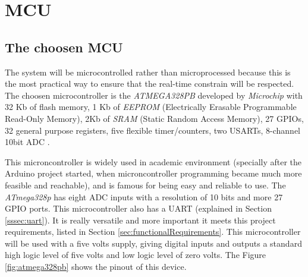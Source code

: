 \section{MCU}\label{sec:mcu-hw}

		\subsection{The choosen MCU}\label{ssec:the-choosen-mcu}

		The system will be microcontrolled rather than microprocessed because this is the most practical way to ensure that the real-time constrain will be respected. The choosen microcontroller is the \textit{ATMEGA328PB} developed by \textit{Microchip} with 32 Kb of flash memory, 1 Kb of \textit{EEPROM} (Electrically Erasable Programmable Read-Only Memory), 2Kb of \textit{SRAM} (Static Random Access Memory), 27 GPIOs, 32 general purpose registers, five flexible timer/counters, two USARTs, 8-channel 10bit ADC \cite{atmega328p-datasheet}. 
		\par
		This microncontroller is widely used in academic environment (specially after the Arduino project started, when microncontroller programming became much more feasible and reachable), and is famous for being easy and reliable to use. The \textit{ATmega328p} has eight ADC inputs with a resolution of 10 bits and more 27 GPIO ports. This microcontroller also has a UART (explained in Section \ref{sssec:uart}). It is really versatile and more important it meets this project requirements, listed in Section \ref{sec:functionalRequirements}. This microcontroller will be used with a five volts supply, giving digital inputs and outputs a standard high logic level of five volts and low logic level of zero volts. The Figure \ref{fig:atmega328pb} shows the pinout of this device.

